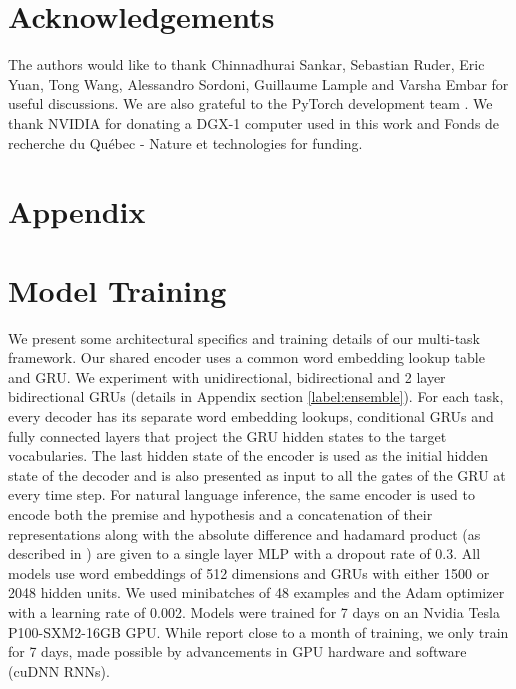 \documentclass{article} \usepackage{iclr2018_conference,times}
\begin{document}
\section*{Acknowledgements}
The authors would like to thank Chinnadhurai Sankar, Sebastian Ruder, Eric Yuan, Tong Wang, Alessandro Sordoni, Guillaume Lample and Varsha Embar for useful discussions. We are also grateful to the PyTorch development team \citep{paszke2017automatic}. We thank NVIDIA for donating a DGX-1 computer used in this work and Fonds de recherche du Québec - Nature et technologies for funding.




\section*{Appendix}

\section{Model Training}
\label{label:model_details}
We present some architectural specifics and training details of our multi-task framework. Our shared encoder uses a common word embedding lookup table and GRU. We experiment with unidirectional, bidirectional and 2 layer bidirectional GRUs (details in Appendix section \ref{label:ensemble}). For each task, every decoder has its separate word embedding lookups, conditional GRUs and fully connected layers that project the GRU hidden states to the target vocabularies. The last hidden state of the encoder is used as the initial hidden state of the decoder and is also presented as input to all the gates of the GRU at every time step. For natural language inference, the same encoder is used to encode both the premise and hypothesis and a concatenation of their representations along with the absolute difference and hadamard product (as described in \cite{conneau2017supervised}) are given to a single layer MLP with a dropout \citep{srivastava2014dropout} rate of 0.3. All models use word embeddings of 512 dimensions and GRUs with either 1500 or 2048 hidden units. We used minibatches of 48 examples and the Adam \cite{kingma2014adam} optimizer with a learning rate of 0.002. Models were trained for 7 days on an Nvidia Tesla P100-SXM2-16GB GPU. While \cite{kiros2015skip} report close to a month of training, we only train for 7 days, made possible by advancements in GPU hardware and software (cuDNN RNNs).
\end{document}
